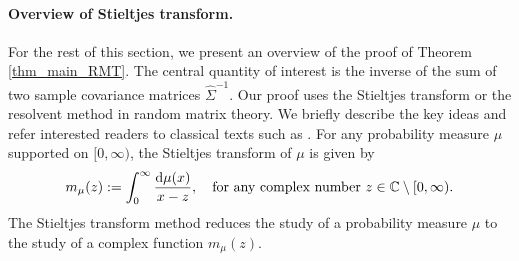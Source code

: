 


\paragraph{Overview of Stieltjes transform.}
For the rest of this section, we present an overview of the proof of Theorem \ref{thm_main_RMT}.
The central quantity of interest is the inverse of the sum of two sample covariance matrices $\hat{\Sigma}^{-1}$.
Our proof uses the Stieltjes transform or the resolvent method in random matrix theory.
We briefly describe the key ideas and refer interested readers to classical texts such as  \citet{bai2009spectral,tao2012topics,erdos2017dynamical}.
For any probability measure $\mu$ supported on $[0,\infty)$, the Stieltjes transform of $\mu$ is given by
$$m_\mu(z):= \int_0^\infty \frac{\mathrm{d}\mu(x)}{x-z}, \ \ \text{ for any complex number } z\in \mathbb{C}\setminus [0,\infty).$$
The Stieltjes transform method reduces the study of a probability measure $\mu$ to the study of a complex function $m_\mu(z)$.

